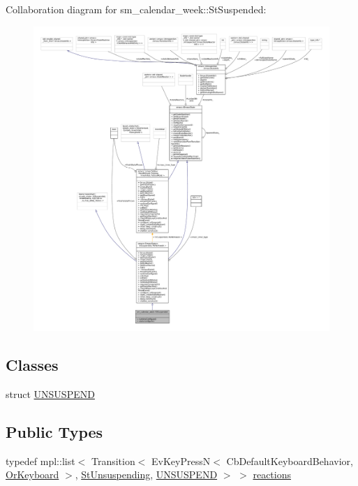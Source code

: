 Collaboration diagram for sm\+\_\+calendar\+\_\+week\+:\+:St\+Suspended\+:
\nopagebreak
\begin{figure}[H]
\begin{center}
\leavevmode
\includegraphics[width=350pt]{structsm__calendar__week_1_1StSuspended__coll__graph}
\end{center}
\end{figure}
\subsection*{Classes}
\begin{DoxyCompactItemize}
\item 
struct \hyperlink{structsm__calendar__week_1_1StSuspended_1_1UNSUSPEND}{U\+N\+S\+U\+S\+P\+E\+ND}
\end{DoxyCompactItemize}
\subsection*{Public Types}
\begin{DoxyCompactItemize}
\item 
typedef mpl\+::list$<$ Transition$<$ Ev\+Key\+PressN$<$ Cb\+Default\+Keyboard\+Behavior, \hyperlink{classsm__calendar__week_1_1OrKeyboard}{Or\+Keyboard} $>$, \hyperlink{structsm__calendar__week_1_1StUnsuspending}{St\+Unsuspending}, \hyperlink{structsm__calendar__week_1_1StSuspended_1_1UNSUSPEND}{U\+N\+S\+U\+S\+P\+E\+ND} $>$ $>$ \hyperlink{structsm__calendar__week_1_1StSuspended_a686126739b844903b41dea3b8601f318}{reactions}
\end{DoxyCompactItemize}
